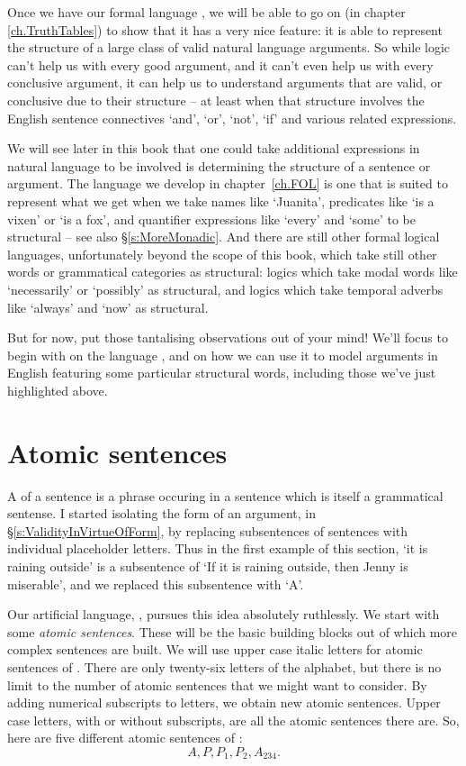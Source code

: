 Once we have our formal language \TFL, we will be able to go on (in chapter \ref{ch.TruthTables}) to show that it has a very nice feature: it is able to represent the structure of a large class of valid natural language arguments. So while logic can't help us with every good argument, and it can't even help us with every conclusive argument, it can help us to understand arguments that are valid, or conclusive due to their structure – at least when that structure involves the English sentence connectives `and', `or', `not', `if' and various related expressions.


We will see later in this book that one could take additional  expressions in natural language to be involved is determining the structure of a sentence or argument. The language we develop in chapter~\ref{ch.FOL} is one that is suited to represent what we get when we take names like `Juanita', predicates like `is a vixen' or `is a fox', and quantifier expressions like `every' and `some' to be structural – see also §\ref{s:MoreMonadic}. And there are still other formal logical languages, unfortunately beyond the scope of this book, which take still other words or grammatical categories as structural: logics which take modal words like `necessarily' or `possibly' as structural, and logics which take temporal adverbs like `always' and `now' as structural. 

But for now, put those tantalising observations out of your mind! We'll focus to begin with on the language \TFL, and on how we can use it to model arguments in English featuring some particular structural words, including those we've just highlighted above. 

\section{Atomic sentences}
A  of a sentence is a phrase occuring in a sentence which is itself a grammatical sentense. I started isolating the form of an argument, in §\ref{s:ValidityInVirtueOfForm}, by replacing subsentences of sentences with individual placeholder letters. Thus in the first example of this section, `it is raining outside' is a subsentence of `If it is raining outside, then Jenny is miserable', and we replaced this subsentence with `A'. 

Our artificial language, \TFL, pursues this idea absolutely ruthlessly. We start with some \emph{atomic sentences}. These will be the basic building blocks out of which more complex sentences are built. We will use upper case italic letters for atomic sentences of \TFL. There are only twenty-six letters of the alphabet, but there is no limit to the number of atomic sentences that we might want to consider. By adding numerical subscripts to letters, we obtain new atomic sentences. Upper case letters, with or without subscripts, are all the atomic sentences there are. So, here are five different atomic sentences of \TFL:
	$$A, P, P_{1}, P_{2}, A_{234}.$$ 

